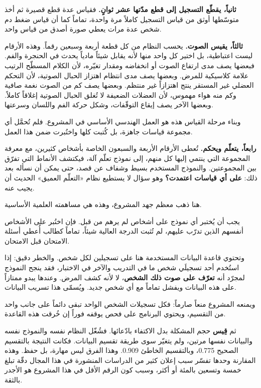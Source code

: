 \documentclass[11pt,a4paper]{report}
\newcommand{\shead}[1]{\par\vspace{7pt}\noindent{\large\textbf{#1}}\par\vspace{2pt}}
\begin{document}
\begin{Arabic}
\textbf{ثانياً، يقطّع التسجيل إلى قطع مدّتها عشر ثوانٍ.} فقياس عدة
قطع قصيرة ثم أخذ متوسّطها أوثق من قياس التسجيل كاملاً مرة واحدة،
تماماً كما أن قياس ضغط دم شخص عدة مرات يعطي صورة أصدق من قياس واحد.

\textbf{ثالثاً، يقيس الصوت.} يحسب النظام من كل قطعة أربعة وسبعين
رقماً. وهذه الأرقام ليست اعتباطية، بل اختير كل واحد منها لأنه يقابل
شيئاً مادياً يحدث في الحنجرة والفم. فبعضها يصف مدى ارتفاع الصوت أو
انخفاضه ومقدار تغيّره، لأن الكلام المسطّح الرتيب علامة كلاسيكية
للمرض. وبعضها يصف مدى انتظام اهتزاز الحبال الصوتية، لأن التحكم العضلي
غير المستقر ينتج اهتزازاً غير منتظم. وبعضها يصف كم من الصوت نغمة صافية
وكم منه هواء مهموس، لأن العضلات الضعيفة لا تُغلق الحبال الصوتية
إغلاقاً كاملاً. وبعضها الآخر يصف إيقاع التوقّفات، وشكل حركة الفم
واللسان وسرعتها.

وبناء مرحلة القياس هذه هو العمل الهندسي الأساسي في المشروع. فلم
تُحمَّل أي مجموعة قياسات جاهزة، بل كُتبت كلها واختُبرت ضمن هذا العمل.

\textbf{رابعاً، يتعلّم ويحكم.} تُعطى الأرقام الأربعة والسبعون الخاصة
بأشخاص كثيرين، مع معرفة المجموعة التي ينتمي إليها كل منهم، إلى نموذج
تعلّم آلة، فيكتشف الأنماط التي تفرّق بين المجموعتين. والنموذج المستخدم
بسيط وشفاف عن قصد، حتى يمكن أن نسأله بعد ذلك: \textbf{على أي قياسات
اعتمدت؟} وهو سؤال لا يستطيع نظام «التعلّم العميق» الحديث أن يجيب عنه.

\shead{4. السؤال المركزي: كيف نختبره بأمانة؟}
هنا ذهب معظم جهد المشروع، وهذه هي مساهمته العلمية الأساسية.

يجب أن يُختبر أي نموذج على أشخاص لم يرهم من قبل. فإن اختُبر على
الأشخاص أنفسهم الذين تدرّب عليهم، لم تُثبت الدرجة العالية شيئاً،
تماماً كطالب أُعطي أسئلة الامتحان قبل الامتحان.

وتحتوي قاعدة البيانات المستخدمة هنا على تسجيلين لكل شخص. والخطر دقيق:
إذا استُخدم أحد تسجيلَي شخص ما في التدريب والآخر في الاختبار، فقد ينجح
النموذج لمجرّد أنه \textbf{تعرّف على صوت ذلك الشخص}، لا لأنه كشف
المرض. وعندها يبدو ممتازاً على هذه البيانات ويفشل تماماً مع أي شخص
جديد. ويُسمّى هذا تسريب البيانات.

ويمنعه المشروع منعاً صارماً: فكل تسجيلات الشخص الواحد تبقى دائماً على
جانب واحد من التقسيم، ويحتوي البرنامج على فحص يوقفه فوراً إن خُرقت
هذه القاعدة.

ثم \textbf{قِيس} حجم المشكلة بدل الاكتفاء بادّعائها. فشُغّل النظام
نفسه والنموذج نفسه والبيانات نفسها مرتين، ولم يتغيّر سوى طريقة تقسيم
البيانات. فكانت النتيجة بالتقسيم الصحيح \textenglish{0.775}،
وبالتقسيم الخاطئ \textenglish{0.909}. وهذا الفرق ليس مهارة، بل حفظ.
وهذه المقارنة وحدها تفسّر سبب إعلان كثير من الدراسات المنشورة في هذا
المجال دقّة تبلغ خمسة وتسعين بالمئة أو أكثر، وسبب كون الرقم الأقل في
هذا المشروع هو الأجدر بالثقة.


\end{Arabic}
\end{document}
